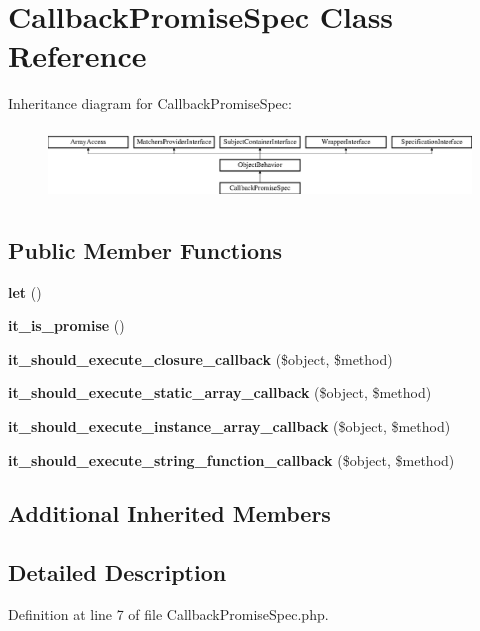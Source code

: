 \section{Callback\+Promise\+Spec Class Reference}
\label{classspec_1_1_prophecy_1_1_promise_1_1_callback_promise_spec}
Inheritance diagram for Callback\+Promise\+Spec\+:\begin{figure}[H]
\begin{center}
\leavevmode
\includegraphics[height=1.953488cm]{classspec_1_1_prophecy_1_1_promise_1_1_callback_promise_spec}
\end{center}
\end{figure}
\subsection*{Public Member Functions}
\begin{DoxyCompactItemize}
\item 
{\bf let} ()
\item 
{\bf it\+\_\+is\+\_\+promise} ()
\item 
{\bf it\+\_\+should\+\_\+execute\+\_\+closure\+\_\+callback} (\$object, \$method)
\item 
{\bf it\+\_\+should\+\_\+execute\+\_\+static\+\_\+array\+\_\+callback} (\$object, \$method)
\item 
{\bf it\+\_\+should\+\_\+execute\+\_\+instance\+\_\+array\+\_\+callback} (\$object, \$method)
\item 
{\bf it\+\_\+should\+\_\+execute\+\_\+string\+\_\+function\+\_\+callback} (\$object, \$method)
\end{DoxyCompactItemize}
\subsection*{Additional Inherited Members}


\subsection{Detailed Description}


Definition at line 7 of file Callback\+Promise\+Spec.\+php.



